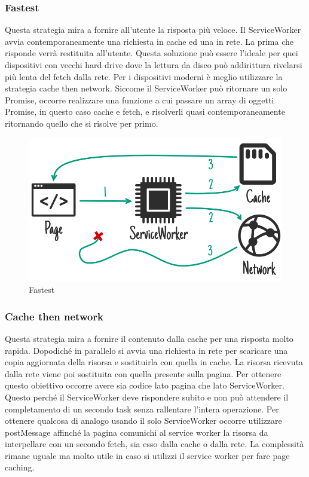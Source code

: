 \documentclass[11pt ,a4paper , twoside , openright ]{article}
\begin{document}
\subsubsection{Fastest}
Questa strategia mira a fornire all’utente la risposta più veloce. Il ServiceWorker avvia contemporaneamente una richiesta in cache ed una in rete. La prima che risponde verrà restituita all’utente.
Questa soluzione può essere l’ideale per quei dispositivi con vecchi hard drive dove la lettura da disco può addirittura rivelarsi più lenta del fetch dalla rete. Per i dispositivi moderni è meglio utilizzare la strategia cache then network.
Siccome il ServiceWorker può ritornare un solo Promise, occorre realizzare una funzione a cui passare un array di oggetti Promise, in questo caso cache e fetch, e risolverli quasi contemporaneamente ritornando quello che si risolve per primo.

\begin{figure}[h]
	\centering
	\includegraphics[width=1\linewidth]{Strategia5}
	\caption{Fastest}
	\label{fig: Fastest}
\end{figure}
\pagebreak
\subsubsection{Cache then network}
Questa strategia mira a fornire il contenuto dalla cache per una risposta molto rapida. Dopodiché in parallelo si avvia una richiesta in rete per scaricare una copia aggiornata della risorsa e sostituirla con quella in cache. La risorsa ricevuta dalla rete viene poi sostituita con quella presente sulla pagina.
Per ottenere questo obiettivo occorre avere sia codice lato pagina che lato ServiceWorker. Questo perché il ServiceWorker deve rispondere subito e non può attendere il completamento di un secondo task senza rallentare l’intera operazione.
Per ottenere qualcosa di analogo usando il solo ServiceWorker occorre utilizzare postMessage affinché la pagina comunichi al service worker la risorsa da interpellare con un secondo fetch, sia esso dalla cache o dalla rete. La complessità rimane uguale ma molto utile in caso si utilizzi il service worker per fare page caching.
\end{document}

